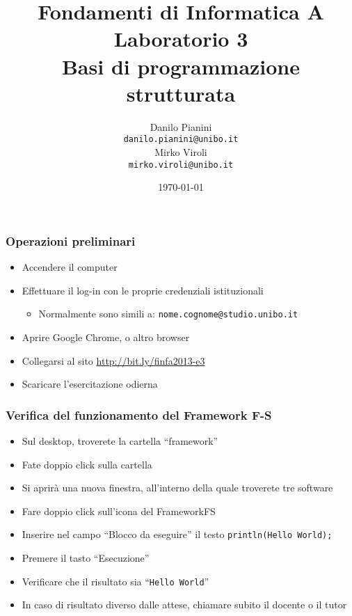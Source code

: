 \documentclass{beamer}
\begin{document}
\title[Lab1 - FV]{Fondamenti di Informatica A \\ Laboratorio 3 \\ Basi di programmazione strutturata}
\author[Danilo Pianini]{Danilo Pianini\\\texttt{danilo.pianini@unibo.it} \\ \vspace{3pt} Mirko Viroli\\\texttt{mirko.viroli@unibo.it} }
\date[\today]{\today}

\frame{\titlepage} 

\begin{frame}
\frametitle{Operazioni preliminari}
\begin{itemize}
 \item Accendere il computer
 \item Effettuare il log-in con le proprie credenziali istituzionali
  \begin{itemize}
    \item Normalmente sono simili a: \texttt{nome.cognome@studio.unibo.it}
  \end{itemize}
 \item Aprire Google Chrome, o altro browser
 \item Collegarsi al sito \url{http://bit.ly/finfa2013-e3}
 \item Scaricare l'esercitazione odierna
\end{itemize}
\end{frame}

\begin{frame}
\frametitle{Verifica del funzionamento del Framework F-S}
\begin{itemize}
 \item Sul desktop, troverete la cartella ``framework''
 \item Fate doppio click sulla cartella
 \item Si aprirà una nuova finestra, all'interno della quale troverete tre software
 \item Fare doppio click sull'icona del FrameworkFS
 \item Inserire nel campo ``Blocco da eseguire'' il testo \texttt{println(\textquotedbl{}Hello World\textquotedbl{});}
 \item Premere il tasto ``Esecuzione''
 \item Verificare che il risultato sia ``\texttt{Hello World}''
 \item In caso di risultato diverso dalle attese, chiamare subito il docente o il tutor
\end{itemize}
\end{frame}
\end{document}
